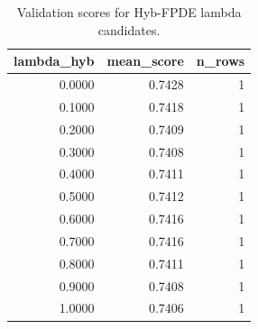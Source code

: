 \begin{table}[t]
\caption{Validation scores for Hyb-FPDE lambda candidates.}
\label{tab:lambda_distribution_computed}
\centering
\begin{tabular}{rrr}
\toprule
lambda\_hyb & mean\_score & n\_rows \\
\midrule
0.0000 & 0.7428 & 1 \\
0.1000 & 0.7418 & 1 \\
0.2000 & 0.7409 & 1 \\
0.3000 & 0.7408 & 1 \\
0.4000 & 0.7411 & 1 \\
0.5000 & 0.7412 & 1 \\
0.6000 & 0.7416 & 1 \\
0.7000 & 0.7416 & 1 \\
0.8000 & 0.7411 & 1 \\
0.9000 & 0.7408 & 1 \\
1.0000 & 0.7406 & 1 \\
\bottomrule
\end{tabular}

\end{table}
